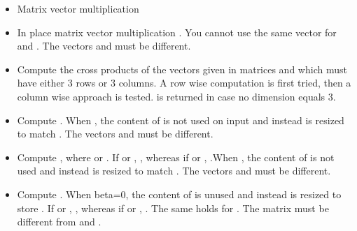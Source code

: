 \begin{itemize}
\item {} 
  \sshortdescribe Matrix vector multiplication  

\item {} 
  \sshortdescribe In place matrix vector multiplication  .  You
  cannot use the same vector for  and . The vectors  and 
  must be different.

\item {}
  \sshortdescribe Compute the cross products of the vectors given in matrices
   and  which must have either 3 rows or 3 columns. A row wise
  computation is first tried, then a column wise approach is tested.
   is returned in case no dimension equals 3.

  
\item {} 
  \sshortdescribe Compute . When , the
  content of  is not used on input and instead  is resized to
  match . The vectors  and  must be different.


\item {}
  \sshortdescribe Compute , where  or . If  or , , whereas if  or , .When
  , the content of  is not used and instead  is resized
  to match . The vectors  and  must be different.

\item {}
  \sshortdescribe Compute . When beta=0, the content of  is unused and instead 
  is resized to store . If  or
  , , whereas if  or
  , . The same holds for . The matrix
   must be different from  and .
  

\end{itemize}
